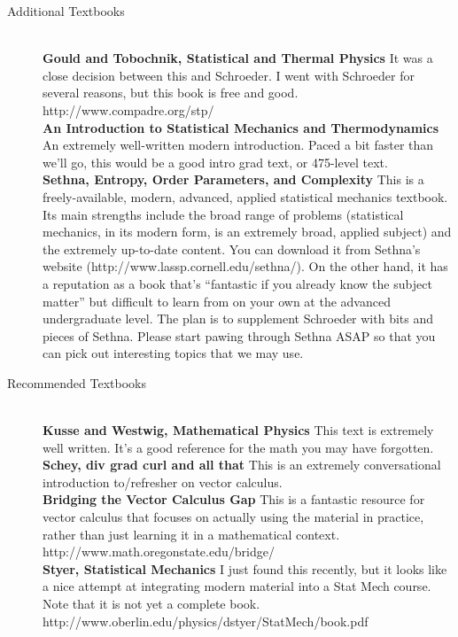 \documentclass[12pt]{article}
\begin{document}
\begin{description}
\item[Additional Textbooks]
 \hfill \\
\textbf{Gould and Tobochnik, Statistical and Thermal Physics} It was a
close decision between this and Schroeder. I went with Schroeder for
several reasons, but this book is free and good.
http://www.compadre.org/stp/
\\
\textbf{An Introduction to Statistical Mechanics and Thermodynamics} An 
extremely well-written modern introduction. Paced a bit faster than we'll go,
this would be a good intro grad text, or 475-level text.
\\
\textbf{Sethna, Entropy, Order Parameters, and Complexity}
This is a freely-available, modern, advanced, applied statistical
mechanics textbook. Its main strengths include the broad range of
problems (statistical mechanics, in its modern form, is an extremely
broad, applied subject) and the extremely up-to-date content. You can
download it from Sethna's website
(http://www.lassp.cornell.edu/sethna/). On the other hand, it has a
reputation as a book that's ``fantastic if you already know the
subject matter'' but difficult to learn from on your own at the
advanced undergraduate level. The plan is to supplement Schroeder with
bits and pieces of Sethna. Please start pawing through Sethna ASAP so
that you can pick out interesting topics that we may use. \hfill \\
\item[Recommended Textbooks] \hfill \\
\textbf{Kusse and Westwig, Mathematical Physics}
This text is extremely well written. It's a good reference for the
math you may have forgotten. \\
\textbf{Schey, div grad curl and all that}
This is an extremely conversational introduction to/refresher on
vector calculus. \hfill \\
\textbf{Bridging the Vector Calculus Gap} This is a fantastic resource
for vector calculus that focuses on actually using the material in
practice, rather than just learning it in a mathematical
context. http://www.math.oregonstate.edu/bridge/ 
\\
\textbf{Styer, Statistical Mechanics} I just found this recently, but
it looks like a nice attempt at integrating modern material into a
Stat Mech course. Note that it is not yet a complete
book. http://www.oberlin.edu/physics/dstyer/StatMech/book.pdf
\end{description}
\end{document}
